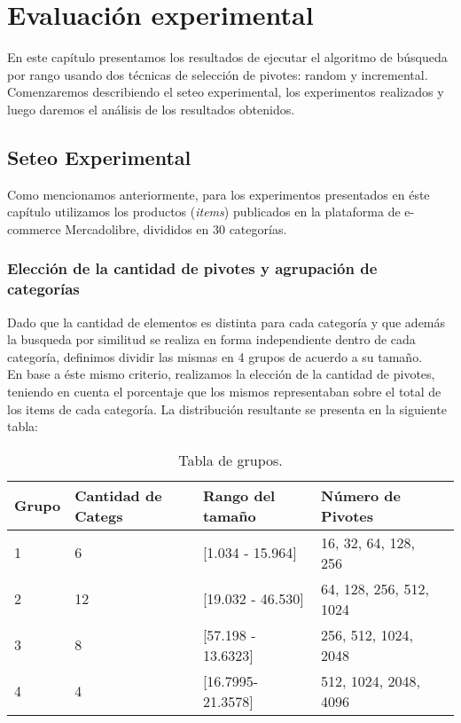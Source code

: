 \chapter{Evaluaci\'on experimental}

En este cap\'itulo presentamos los resultados de ejecutar el algoritmo de b\'usqueda por rango usando dos t\'ecnicas de selecci\'on de pivotes: random y incremental.\\

Comenzaremos describiendo el seteo experimental, los experimentos realizados y luego daremos el an\'alisis de los resultados obtenidos.\\

\section{Seteo Experimental}

Como mencionamos anteriormente, para los experimentos presentados en \'este cap\'itulo utilizamos los productos (\textit{items}) publicados en la plataforma de e-commerce Mercadolibre, divididos en 30 categor\'ias.\\

\subsection{Elecci\'on de la cantidad de pivotes y agrupaci\'on de categor\'ias}
Dado que la cantidad de elementos es distinta para cada categor\'ia y que adem\'as la busqueda por similitud se realiza en forma independiente dentro de cada categor\'ia, definimos dividir las mismas en 4 grupos de acuerdo a su tamaño.\\

En base a \'este mismo criterio, realizamos la elecci\'on de la cantidad de pivotes, teniendo en cuenta el porcentaje que los mismos representaban sobre el total de los items de cada categor\'ia. La distribuci\'on resultante se presenta en la siguiente tabla:\\

\begin{table}[htbp]
\begin{center}
\begin{tabular}{|p{1.1cm}|p{1.8cm}|p{3.2cm}|p{2.2cm}|p{2.5cm}|}
\hline
Grupo & 
Cantidad de Categs & 
Rango del tama\~no & 
N\'umero de Pivotes \\
\hline \hline
1 & 
6 & 
[1.034 - 15.964] & 
16, 32, 64, 128, 256  \\ \hline
2 &
12 &
[19.032 - 46.530] &
64, 128, 256, 512, 1024  \\ \hline
3 &
8 &
[57.198 - 13.6323] &
256, 512, 1024, 2048  \\ \hline
4 &
4 &
[16.7995- 21.3578] &
512, 1024, 2048, 4096  \\ \hline
\end{tabular}
\caption{Tabla de grupos.}
\label{tabla:grupos}
\end{center}
\end{table}


